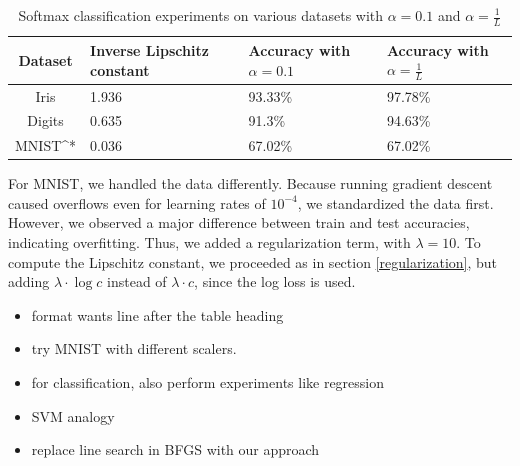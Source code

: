 \documentclass{article}
\begin{document}
\begin{table}
    \caption{Softmax classification experiments on various datasets with $\alpha=0.1$ and $\alpha=\frac{1}{L}$}
    \centering
    \begin{tabularx}{\textwidth}{cYYY}
        \toprule
        Dataset & Inverse Lipschitz constant & Accuracy with $\alpha=0.1$ & Accuracy with $\alpha=\frac{1}{L}$ \\
        \midrule
        Iris & 1.936 & 93.33\% & 97.78\% \\
        Digits & 0.635 & 91.3\% & 94.63\% \\
        MNIST^* & 0.036 & 67.02\% & 67.02\% \\
        \bottomrule
    \end{tabularx}
    \label{tab:classif:2}
\end{table}

For MNIST, we handled the data differently. Because running gradient descent caused overflows even for learning rates of $10^{-4}$, we standardized the data first. However, we observed a major difference between train and test accuracies, indicating overfitting. Thus, we added a regularization term, with $\lambda=10$. To compute the Lipschitz constant, we proceeded as in section \ref{regularization}, but adding $\lambda \cdot \log c$ instead of $\lambda \cdot c$, since the log loss is used.

\begin{itemize}
    \item format wants line after the table heading
    \item try MNIST with different scalers.
    \item for classification, also perform experiments like regression
    \item SVM analogy
    \item replace line search in BFGS with our approach
\end{itemize}


\end{document}
